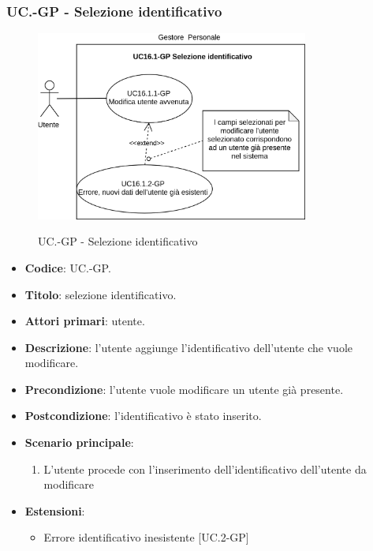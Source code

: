 	\subsubsection{UC\theuccount.\thesubuccount-GP - Selezione identificativo}
		\begin{figure}[H]
			\centering
			\includegraphics[width=0.8\textwidth]{img/casi_d'uso/UC16_1.png}\\
			\caption{UC\theuccount.\thesubuccount-GP - Selezione identificativo}
		\end{figure}
		\begin{itemize}
			\item \textbf{Codice}: UC\theuccount.\thesubuccount-GP.
			\item \textbf{Titolo}: selezione identificativo.
			\item \textbf{Attori primari}: utente.
			\item \textbf{Descrizione}: l'utente aggiunge l'identificativo dell'utente che vuole modificare.
			\item \textbf{Precondizione}: l'utente vuole modificare un utente già presente.
			\item \textbf{Postcondizione}: l'identificativo è stato inserito.
			\item \textbf{Scenario principale}:
			\begin{enumerate}
				\item L'utente procede con l'inserimento dell'identificativo dell'utente da modificare
			\end{enumerate}
			\item \textbf{Estensioni}:
			\begin{itemize}
				\item Errore identificativo inesistente [UC\theuccount.2-GP]
			\end{itemize}
		\end{itemize}
		
